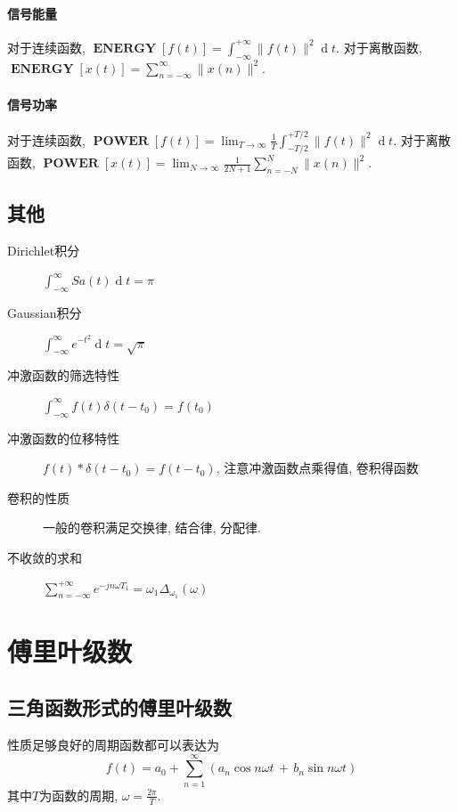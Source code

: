 \documentclass{ctexart}
\DeclareMathOperator{\ENERGY}{\mathbf{ENERGY}}
\DeclareMathOperator{\POWER}{\mathbf{POWER}}
\DeclareMathOperator{\ud}{\mathrm{d}}
\begin{document}
\paragraph{信号能量} 对于连续函数, $\ENERGY[f(t)] = \int_{-\infty}^{+\infty} \|f(t)\|^2 \ud t$.
    对于离散函数, $\ENERGY[x(t)] = \sum_{n = -\infty}^{\infty} \|x(n)\|^2$.
\paragraph{信号功率} 对于连续函数, $\POWER[f(t)] = \lim_{T \to \infty} \frac{1}{T} \int_{-T/2}^{+T/2} \|f(t)\|^2 \ud t$.
    对于离散函数, $\POWER[x(t)] = \lim_{N \to \infty} \frac{1}{2N + 1} \sum_{n = -N}^{N} \|x(n)\|^2$.
\subsection{其他}
    \begin{description}
        \item[Dirichlet积分] $\int_{-\infty}^{\infty} Sa(t) \ud t = \pi$
        \item[Gaussian积分] $\int_{-\infty}^{\infty} e^{-t^2} \ud t = \sqrt{\pi}$
        \item[冲激函数的筛选特性] $\int_{-\infty}^{\infty} f(t) \delta(t - t_0) = f(t_0)$
        \item[冲激函数的位移特性] $f(t) * \delta(t - t_0) = f(t - t_0)$, 注意冲激函数点乘得值, 卷积得函数
        \item[卷积的性质] 一般的卷积满足交换律, 结合律, 分配律.
        \item[不收敛的求和] $\sum_{n = -\infty}^{+\infty} e^{-j n \omega T_1} = \omega_1 \Delta_{\omega_1}(\omega)$
    \end{description}

\section{傅里叶级数}
\subsection{三角函数形式的傅里叶级数}
    性质足够良好的周期函数都可以表达为\[
        f(t) = a_0 + \sum_{n = 1}^{\infty} \left( a_n \cos n\omega t \,+\, b_n \sin n\omega t \right)\]
    其中$T$为函数的周期, $\omega = \frac{2\pi}{T}$.
\end{document}
